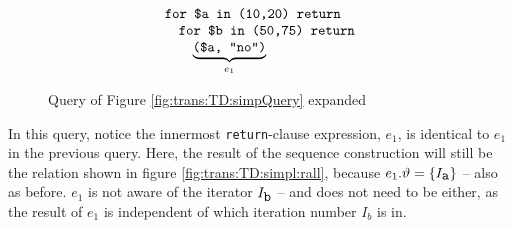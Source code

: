 \begin{myExample}
\begin{figure}[h]
\begin{equation*}
\begin{array}{l}
\mbox{\texttt{for \$a in (10,20) return}} \\ \quad
\mbox{\texttt{for \$b in (50,75) return}} \\ \quad \quad
\underbrace{ \mbox{\texttt{(\$a, "no")}} }_{e_{1}}
\end{array}
\end{equation*}
\caption{Query of Figure \ref{fig:trans:TD:simpQuery} expanded}
\label{fig:trans:TD:expandQuery}
\end{figure}

In this query, notice the innermost \texttt{return}-clause expression, $e_{1}$, is identical to $e_{1}$ in the
previous query. Here, the result of the sequence construction will still be the relation shown in figure
\ref{fig:trans:TD:simpl:rall}, because $e_{1}.\vartheta=\left\{I_{\mbox{\texttt{a}}}\right\}$ -- also as before.
$e_{1}$ is not aware of the iterator $I_{\mbox{\texttt{b}}}$ -- and does not need to be either, as the result of
$e_{1}$ is independent of which iteration number $I_{b}$ is in.

\end{myExample}
